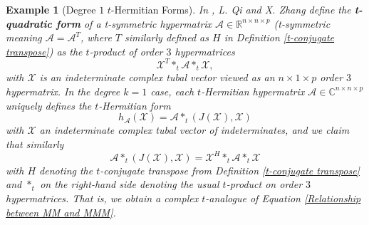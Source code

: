 \documentclass[11pt]{article}
\newtheorem{example}[theorem]{Example}
\begin{document}
\begin{example}[Degree $1$ $t$-Hermitian Forms]\label{Degree 1 t-Hermitian Forms}
    In \cite{qi2021t}, L. Qi and X. Zhang define the \textbf{t-quadratic form} of a t-symmetric hypermatrix $\mathcal{A}\in \mathbb{R}^{n\times n\times p}$ (t-symmetric meaning $\mathcal{A} = \mathcal{A}^T$, where $T$ similarly defined as $H$ in Definition \ref{t-conjugate transpose}) as the $t$-product of order $3$ hypermatrices
    \[\mathcal{X}^T*_t\mathcal{A}*_t\mathcal{X},\]
    with $\mathcal{X}$ is an indeterminate complex tubal vector viewed as an $n\times 1\times p$ order $3$ hypermatrix. In the degree $k=1$ case, each $t$-Hermitian hypermatrix $\mathcal{A}\in \mathbb{C}^{n\times n\times p}$ uniquely defines the $t$-Hermitian form 
    \[h_{\mathcal{A}}(\mathcal{X}) = \mathcal{A}*_t(J(\mathcal{X}),\mathcal{X})\]
    with $\mathcal{X}$ an indeterminate complex tubal vector of indeterminates, and we claim that similarly 
    \[\mathcal{A}*_t(J(\mathcal{X}),\mathcal{X}) = \mathcal{X}^H*_t\mathcal{A}*_t\mathcal{X}\]
    with $H$ denoting the $t$-conjugate transpose from Definition \ref{t-conjugate transpose} and $*_t$ on the right-hand side denoting the usual $t$-product on order $3$ hypermatrices. That is, we obtain a complex $t$-analogue of Equation \eqref{Relationship between MM and MMM}. 
    

\end{example}
\end{document}
